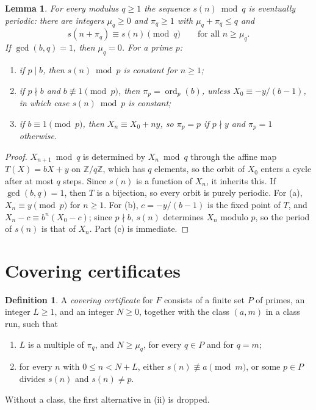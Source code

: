 \documentclass[11pt]{article}
\newtheorem{lemma}[theorem]{Lemma}
\theoremstyle{definition}
\newtheorem{definition}[theorem]{Definition}
\theoremstyle{remark}
\newcommand{\ord}{\operatorname{ord}}
\begin{document}
\begin{lemma}\label{lem:period}
For every modulus $q\ge 1$ the sequence $s(n)\bmod q$ is eventually periodic: there are integers $\mu_q\ge 0$ and $\pi_q\ge 1$ with $\mu_q+\pi_q\le q$ and
\[
  s(n+\pi_q)\equiv s(n)\pmod q\qquad\text{for all } n\ge\mu_q .
\]
If $\gcd(b,q)=1$, then $\mu_q=0$. For a prime $p$:
\begin{enumerate}[label=(\alph*)]
\item if $p\mid b$, then $s(n)\bmod p$ is constant for $n\ge 1$;
\item if $p\nmid b$ and $b\not\equiv 1 \pmod p$, then $\pi_p=\ord_p(b)$, unless $X_0\equiv -y/(b-1)$, in which case $s(n)\bmod p$ is constant;
\item if $b\equiv 1\pmod p$, then $X_n\equiv X_0+ny$, so $\pi_p=p$ if $p\nmid y$ and $\pi_p=1$ otherwise.
\end{enumerate}
\end{lemma}

\begin{proof}
$X_{n+1}\bmod q$ is determined by $X_n\bmod q$ through the affine map $T(X)=bX+y$ on $\mathbb{Z}/q\mathbb{Z}$, which has $q$ elements, so the orbit of $X_0$ enters a cycle after at most $q$ steps. Since $s(n)$ is a function of $X_n$, it inherits this. If $\gcd(b,q)=1$, then $T$ is a bijection, so every orbit is purely periodic. For (a), $X_n\equiv y\pmod p$ for $n\ge1$. For (b), $c=-y/(b-1)$ is the fixed point of $T$, and $X_n-c\equiv b^n(X_0-c)$; since $p\nmid b$, $s(n)$ determines $X_n$ modulo $p$, so the period of $s(n)$ is that of $X_n$. Part (c) is immediate.
\end{proof}

\section{Covering certificates}

\begin{definition}
A \emph{covering certificate} for $F$ consists of a finite set $P$ of primes, an integer $L\ge 1$, and an integer $N\ge 0$, together with the class $(a,m)$ in a class run, such that
\begin{enumerate}[label=(\roman*)]
\item $L$ is a multiple of $\pi_q$, and $N\ge\mu_q$, for every $q\in P$ and for $q=m$;
\item for every $n$ with $0\le n<N+L$, either $s(n)\not\equiv a\pmod m$, or some $p\in P$ divides $s(n)$ and $s(n)\ne p$.
\end{enumerate}
Without a class, the first alternative in (ii) is dropped.
\end{definition}
\end{document}
